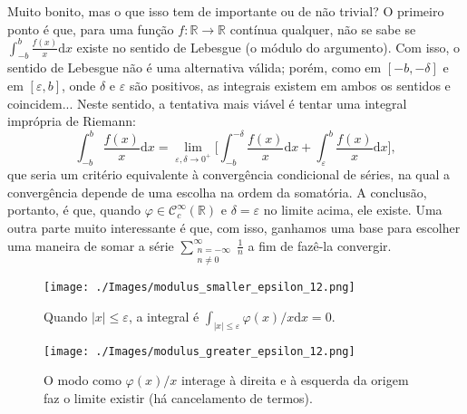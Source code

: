 \documentclass[../distribution_theory_notes.tex]{subfiles}
\begin{document}
                            Muito bonito, mas o que isso tem de importante ou de não trivial? O primeiro ponto é que, para uma função \(f:\mathbb{R}\rightarrow \mathbb{R}\) contínua qualquer, não se sabe se \(\int_{-b}^{b}\frac{f(x)}{x} \mathrm{d}x\) existe no sentido de Lebesgue (o módulo do argumento). Com isso, o sentido de Lebesgue não é uma alternativa válida; porém, como em \([-b, -\delta ]\) e em \([\varepsilon , b]\), onde \(\delta \) e \(\varepsilon \) são positivos, as integrais existem em ambos os sentidos e coincidem... Neste sentido, a tentativa mais viável é tentar uma integral imprópria de Riemann: 
                              \[
                                \int_{-b}^{b}\frac{f(x)}{x} \mathrm{d}x = \lim_{\varepsilon , \delta \to 0^{+}} \biggl[\int_{-b}^{-\delta }\frac{f(x)}{x} \mathrm{d}x + \int_{\varepsilon }^{b} \frac{f(x)}{x} \mathrm{d}x\biggr],
                              \]
                              que seria um critério equivalente à convergência condicional de séries, na qual a convergência depende de uma escolha na ordem da somatória. A conclusão, portanto, é que, quando \(\varphi \in \mathcal{C}_{c}^{\infty}(\mathbb{R})\) e \(\delta =\varepsilon \) no limite acima, ele existe. Uma outra parte muito interessante é que, com isso, ganhamos uma base para escolher uma maneira de somar a série \(\sum\limits_{\substack{n=-\infty \\ n\neq 0}}^{\infty}\frac{1}{n}\) a fim de fazê-la convergir.

                             \begin{figure}[H]
                             \begin{center}
                             \texttt{[image: ./Images/modulus\_smaller\_epsilon\_12.png]}
                             \end{center}
                             \caption{Quando \(| x |\leq \varepsilon \), a integral é \(\int_{| x |\leq \varepsilon }^{}\varphi(x)/x \mathrm{d}x=0\).}
                             \end{figure}

                             \begin{figure}[H]
                             \begin{center}
                             \texttt{[image: ./Images/modulus\_greater\_epsilon\_12.png]}
                             \end{center}
                             \caption{O modo como \(\varphi (x)/x\) interage à direita e à esquerda da origem faz o limite existir (há cancelamento de termos).}
                             \end{figure}
\end{document}
